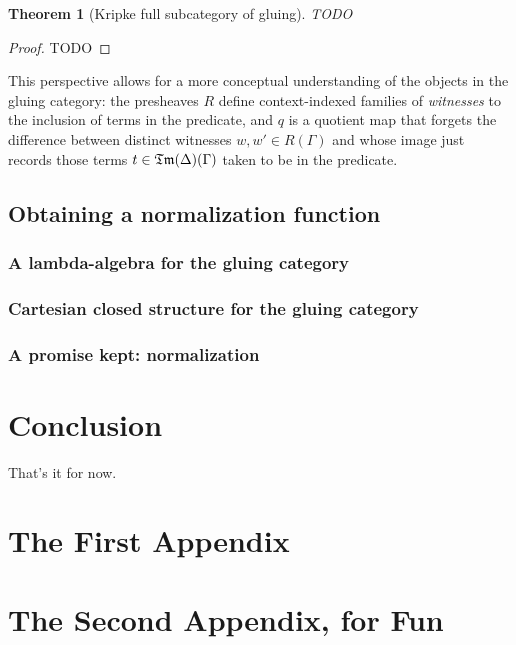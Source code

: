 \documentclass[12pt,twoside]{reedthesis}
\theoremstyle{definition}
\theoremstyle{remark}
\theoremstyle{plain}
\newtheorem{theorem}{Theorem}
\begin{document}
  \begin{theorem}[Kripke full subcategory of gluing]
    TODO
  \end{theorem}
  \begin{proof}
    TODO
  \end{proof}

  This perspective allows for a more conceptual understanding of the objects in
  the gluing category: the presheaves $R$ define context-indexed families of
  \emph{witnesses} to the inclusion of terms in the predicate, and $q$ is a
  quotient map that forgets the difference between distinct witnesses
  \( w, w' \in R(\Gamma) \) and whose image just records those terms
  \( t \in \mathfrak{Tm} (\Delta)(\Gamma)\) taken to be in the predicate.

\section{Obtaining a normalization function}
\subsection{A lambda-algebra for the gluing category}
\subsection{Cartesian closed structure for the gluing category}
\subsection{A promise kept: normalization}

\chapter{Conclusion}
\setcounter{chapter}{4}
\setcounter{section}{0}

That's it for now.

\appendix
\chapter{The First Appendix}
\chapter{The Second Appendix, for Fun}
\end{document}
